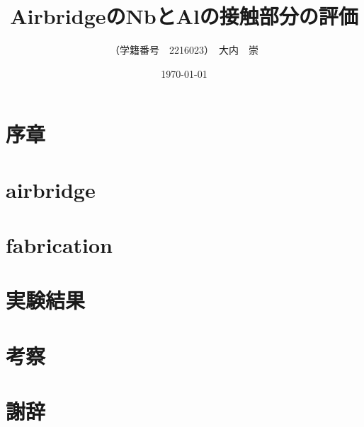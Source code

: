 \documentclass{jsarticle}
\title{AirbridgeのNbとAlの接触部分の評価}
\author{（学籍番号　2216023）　大内　崇}
\date{\today}
\begin{document}
  \maketitle

\tableofcontents

\section{序章}



\section{airbridge}

\section{fabrication}

\section{実験結果}

\section{考察}

\section{謝辞}
\end{document}
